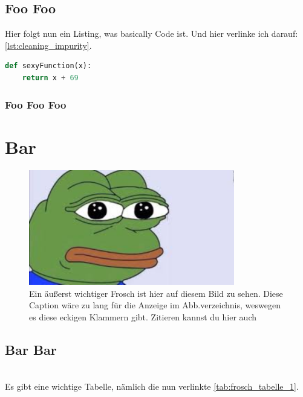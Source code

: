 \documentclass[
	12pt,
    a4paper,
    egregdoesnotlikesansseriftitles, %
    toc=chapterentrywithdots,
    oneside, openany,
    titlepage,
    parskip=half,
    headings=normal,  %
    listof=totoc,
    bibliography=totoc,
    index=totoc,
    captions=tableheading,  %
    listof=flat,
    numbers=noenddot, %
    final]
    {scrbook}
\begin{document}
\section{Foo Foo}
Hier folgt nun ein Listing, was basically Code ist. Und hier verlinke ich darauf: \autoref{lst:cleaning_impurity}.

\begin{lstlisting}[language=Python,caption={Pythonbeispiel nach Albrecht et al. \cite{albrecht_blueprints_2020}},captionpos=b,label={lst:cleaning_impurity}]
def sexyFunction(x):
	return x + 69
\end{lstlisting}	

\subsection{Foo Foo Foo}
\blindtext

\chapter{Bar}
\blindtext
\begin{figure}[h]
	\centering
	\includegraphics[width=0.8\textwidth]{figures/pepe-example.png}
	\caption[Kürzerer Text für Abb.verzeichnis]{Ein äußerst wichtiger Frosch ist hier auf diesem Bild zu sehen. Diese Caption wäre zu lang für die Anzeige im Abb.verzeichnis, weswegen es diese eckigen Klammern gibt. Zitieren kannst du hier auch \cite{albrecht_blueprints_2020}}
	\label{fig:pepe_der_frosch} %
\end{figure}
\blindtext

\section{Bar Bar}
\blindtext
\\Es gibt eine wichtige Tabelle, nämlich die nun verlinkte \autoref{tab:frosch_tabelle_1}.
\end{document}
